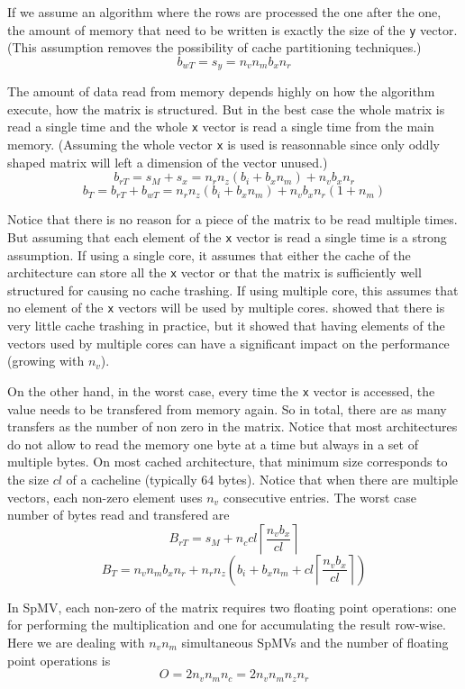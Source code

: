 \documentclass[10pt,conference,compsocconf]{IEEEtran}
\newcommand{\ceil}[1]{\left\lceil#1\right\rceil}
\begin{document}
If we assume an algorithm where the rows are processed the one after
the one, the amount of memory that need to be written is exactly the
size of the {\tt y} vector. (This assumption removes the possibility of
cache partitioning techniques.) $$b_{wT} = s_y = n_v n_m b_x n_r$$

The amount of data read from memory depends highly on how the
algorithm execute, how the matrix is structured. But in the best case
the whole matrix is read a single time and the whole {\tt x} vector is
read a single time from the main memory. (Assuming the whole vector
{\tt x} is used is reasonnable since only oddly shaped matrix will
left a dimension of the vector unused.) $$b_{rT} = s_M + s_x = n_r n_z
(b_i + b_x n_m) + n_v b_x n_r$$
 $$b_T = b_{rT} + b_{wT} =  n_r n_z (b_i + b_x n_m) + n_v b_x n_r (1 + n_m)$$

Notice that there is no reason for a piece of the matrix to be read
multiple times. But assuming that each element of the {\tt x} vector
is read a single time is a strong assumption. If using a single core,
it assumes that either the cache of the architecture can store all the
{\tt x} vector or that the matrix is sufficiently well structured for
causing no cache trashing. If using multiple core, this assumes that
no element of the {\tt x} vectors will be used by multiple
cores. \cite{Saule12} showed that there is very little cache trashing
in practice, but it showed that having elements of the vectors used by
multiple cores can have a significant impact on the performance
(growing with $n_v$).

On the other hand, in the worst case, every time the {\tt x} vector is
accessed, the value needs to be transfered from memory again. So in
total, there are as many transfers as the number of non zero in the
matrix. Notice that most architectures do not allow to read the memory
one byte at a time but always in a set of multiple bytes. On most
cached architecture, that minimum size corresponds to the size $cl$ of
a cacheline (typically 64 bytes). Notice that when there are multiple
vectors, each non-zero element uses $n_v$ consecutive entries. The
worst case number of bytes read and transfered are 
$$B_{rT} = s_M + n_c cl \ceil{\frac{n_vb_x}{cl}} $$ 
$$B_T = n_v n_m b_x n_r + n_r n_z \left ( b_i + b_x n_m +  cl \ceil{\frac{n_vb_x}{cl}} \right)$$

In SpMV, each non-zero of the matrix requires two floating point
operations: one for performing the multiplication and one for
accumulating the result row-wise. Here we are dealing with $n_v n_m$
simultaneous SpMVs and the number of floating point operations is
$$O = 2 n_v n_m n_c = 2 n_v n_m n_z n_r$$
\end{document}
